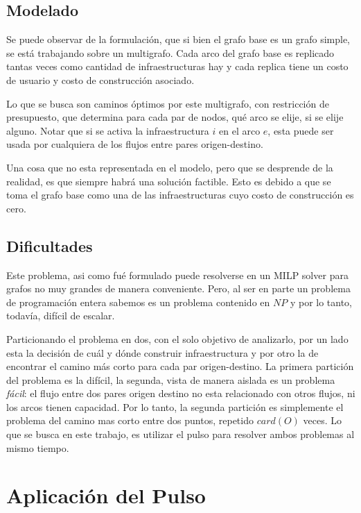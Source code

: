 \documentclass{article}
\begin{document}
  \subsection*{Modelado}

  Se puede observar de la formulación, que si bien el grafo base es un grafo simple, se está trabajando sobre un multigrafo. Cada arco del grafo base es replicado tantas veces como cantidad de infraestructuras hay y cada replica tiene un costo de usuario y costo de construcción asociado.

  Lo que se busca son caminos óptimos por este multigrafo, con restricción de presupuesto, que determina para cada par de nodos, qué arco se elije, si se elije alguno. Notar que si se activa la infraestructura $i$ en el arco $e$, esta puede ser usada por cualquiera de los flujos entre pares origen-destino.

  Una cosa que no esta representada en el modelo, pero que se desprende de la realidad, es que siempre habrá una solución factible. Esto es debido a que se toma el grafo base como una de las infraestructuras cuyo costo de construcción es cero.

  \subsection*{Dificultades}

  Este problema, asi como fué formulado puede resolverse en un MILP solver para grafos no muy grandes de manera conveniente. Pero, al ser en parte un problema de programación entera sabemos es un problema contenido en $NP$ y por lo tanto, todavía, difícil de escalar.

  Particionando el problema en dos, con el solo objetivo de analizarlo, por un lado esta la decisión de cuál y dónde construir infraestructura y por otro la de encontrar el camino más corto para cada par origen-destino. La primera partición del problema es la difícil, la segunda, vista de manera aislada es un problema {\it fácil}: el flujo entre dos pares origen destino no esta relacionado con otros flujos, ni los arcos tienen capacidad. Por lo tanto, la segunda partición es simplemente el problema del camino mas corto entre dos puntos, repetido $card(O)$ veces. Lo que se busca en este trabajo, es utilizar el pulso para resolver ambos problemas al mismo tiempo.

  \section*{Aplicación del Pulso}
\end{document}
